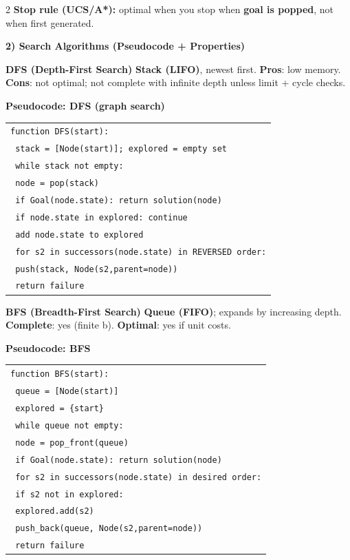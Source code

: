 \documentclass[10pt]{article}
\begin{document}
\begin{multicols*}{2}
\textbf{Stop rule (UCS/A*):} optimal when you stop when \textbf{goal is popped}, not when first generated.

\textbf{2) Search Algorithms (Pseudocode + Properties)}

\textbf{DFS (Depth-First Search)}\newline
\textbf{Stack (LIFO)}, newest first.\newline
\textbf{Pros}: low memory. \textbf{Cons}: not optimal; not complete with infinite depth unless limit + cycle checks.

\textbf{Pseudocode: DFS (graph search)}
\begin{tabular}{@{}l@{}}
\texttt{function DFS(start):}\\
\texttt{ stack = [Node(start)]; explored = empty set}\\
\texttt{ while stack not empty:}\\
\texttt{  node = pop(stack)}\\
\texttt{  if Goal(node.state): return solution(node)}\\
\texttt{  if node.state in explored: continue}\\
\texttt{  add node.state to explored}\\
\texttt{  for s2 in successors(node.state) in REVERSED order:}\\
\texttt{   push(stack, Node(s2,parent=node))}\\
\texttt{ return failure}
\end{tabular}

\textbf{BFS (Breadth-First Search)}\newline
\textbf{Queue (FIFO)}; expands by increasing depth.\newline
\textbf{Complete}: yes (finite b). \textbf{Optimal}: yes if unit costs.

\textbf{Pseudocode: BFS}
\begin{tabular}{@{}l@{}}
\texttt{function BFS(start):}\\
\texttt{ queue = [Node(start)]}\\
\texttt{ explored = \{start\}}\\
\texttt{ while queue not empty:}\\
\texttt{  node = pop\_front(queue)}\\
\texttt{  if Goal(node.state): return solution(node)}\\
\texttt{  for s2 in successors(node.state) in desired order:}\\
\texttt{   if s2 not in explored:}\\
\texttt{    explored.add(s2)}\\
\texttt{    push\_back(queue, Node(s2,parent=node))}\\
\texttt{ return failure}
\end{tabular}


\end{multicols*}
\end{document}
